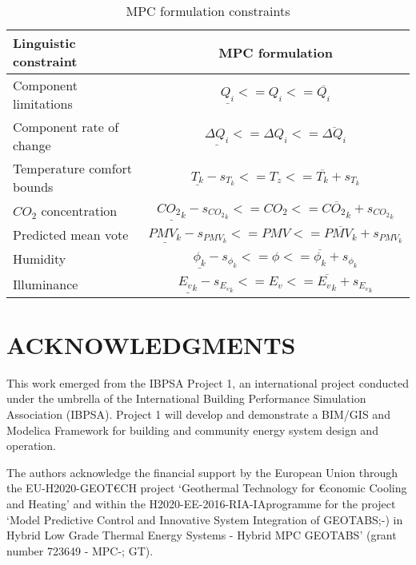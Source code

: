 \documentclass[10pt]{extarticle}
\begin{document}
\renewcommand{\arraystretch}{2.5}
\begin{table}[h]
	\centering
	\caption{MPC formulation constraints}
	\label{tab:mpc_form:constraints}
	\begin{tabular}{l|c}
		\toprule
		\textbf{Linguistic constraint}  & \textbf{MPC formulation} \\
		\midrule
		Component limitations & $ \underline{Q_i}  <= Q_i <= \overline{Q_i} $ \\ 
		Component rate of change & $ \underline{\Delta Q_i}  <= \Delta Q_i <= \overline{\Delta Q_i} $ \\ 
		Temperature comfort bounds &   $ \underline{T_k} - s_{T_k} <= T_z <= \overline{T_k} + s_{T_k} $ \\
		$CO_2$ concentration & $ \underline{{CO_2}_k} - s_{{CO_2}_k} <= CO_2 <= \overline{{CO_2}_k} + s_{{CO_2}_k} $  \\
		Predicted mean vote & $ \underline{PMV_k} - s_{PMV_k} <= PMV <= \overline{PMV_k} + s_{PMV_k} $  \\
		Humidity &  $ \underline{\phi_k} - s_{\phi_k} <= \phi <= \overline{\phi_k} + s_{\phi_k} $  \\
		Illuminance & $ \underline{{E_v}_k} - s_{{E_v}_k} <= E_v <= \overline{{E_v}_k} + s_{{E_v}_k} $  \\
		\bottomrule 
	\end{tabular}
\end{table}




\vspace{24pt}


\section*{ACKNOWLEDGMENTS}

This work emerged from the IBPSA Project 1, an international project conducted under the umbrella of the International Building Performance Simulation Association (IBPSA). Project 1 will develop and demonstrate a BIM/GIS and Modelica Framework for building and community energy system design and operation.

The authors acknowledge the financial support by the European Union through  the EU-H2020-GEOT\euro CH 
project ‘Geothermal Technology for \euro conomic Cooling and Heating’ 
and within the H2020-EE-2016-RIA-IAprogramme for the project ‘Model Predictive Control and Innovative System Integration of GEOTABS;-) 
in Hybrid Low Grade Thermal Energy Systems - Hybrid MPC GEOTABS’ (grant number 723649 - MPC-; GT). 
\end{document}
